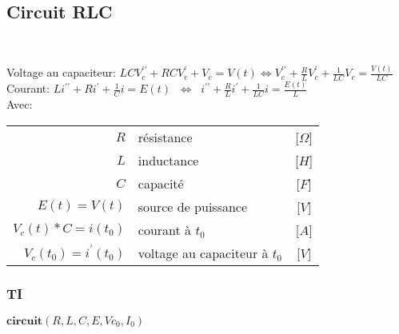 \subsection{Circuit RLC}
{\centering

}
\\\raggedright
Voltage au capaciteur:
{\centering
\(
LC V_c^{\prime\prime} + RC V_c^{\prime} + V_c = V(t)\Longleftrightarrow
V_c^{\prime\prime} + \frac{R}{L} V_c^{\prime} + \frac{1}{LC}V_c = \frac{V(t)}{LC}
\)}\\
Courant:
{\centering\(
L i^{\prime\prime} + R i^{\prime} + \frac{1}{C}i = E(t)\;\;\Longleftrightarrow\;\;
i^{\prime\prime} + \frac{R}{L} i^{\prime} + \frac{1}{LC}i = \frac{E(t)}{L}
\)}\\
Avec:
\begin{tabular}{rlc}
  $R$ & résistance & [$\Omega$] \\
  $L$ & inductance & [$H$]\\
  $C$ & capacité & [$F$]\\
  $E(t)=V(t)$ & source de puissance & [$V$]\\
  $V_c(t)*C = i(t_0)$ & courant à $t_0$ & [$A$]\\
  $V_c(t_0)=i^{\prime}(t_0)$ & voltage au capaciteur à $t_0$ & [$V$]
\end{tabular}


\subsubsection{TI}
\centering
\(\mathbf{circuit}(R,L,C,E,Vc_0,I_0)\)\\